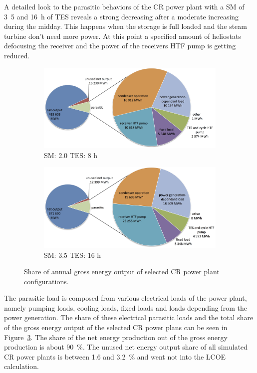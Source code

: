 A detailed look to the parasitic behaviors of the CR power plant with a SM of \si{3.5} and \SI{16}{h} of TES reveals a strong decreasing after a moderate increasing during the midday. This happens when the storage is full loaded and the steam turbine don't need more power. At this point a specified amount of heliostats defocusing the receiver and the power of the receivers HTF pump is getting reduced. 

\begin{figure}[!htbp]
        \centering   
        \begin{subfigure}[b]{0.65\textwidth}
                \centering
                \includegraphics[width=1\textwidth]{FIG/CR_parasitics_low}
                \caption{SM: 2.0 TES: 8 h}\label{CR_parasitics_low}
        \end{subfigure}
\par\medskip %
        \begin{subfigure}[b]{0.65\textwidth}
                \centering
                \includegraphics[width=1\textwidth]{FIG/CR_parasitics_high}
                \caption{SM: 3.5 TES: 16 h}\label{CR_parasitics_high}
        \end{subfigure}
        \caption[Share of annual gross energy output of selected CR power plant configurations.]{Share of annual gross energy output of selected CR power plant configurations.}\label{CR_parasitics}
\end{figure}
The parasitic load is composed from various electrical loads of the power plant, namely pumping loads, cooling loads, fixed loads and loads depending from the power generation. The share of these electrical parasitic loads and the total share of the gross energy output of the selected CR power plans can be seen in Figure~\ref{CR_parasitics}. The share of the net energy production out of the gross energy production is about 90~\%. The unused net energy output share of all simulated CR power plants is between 1.6 and 3.2~\% and went not into the LCOE calculation.

